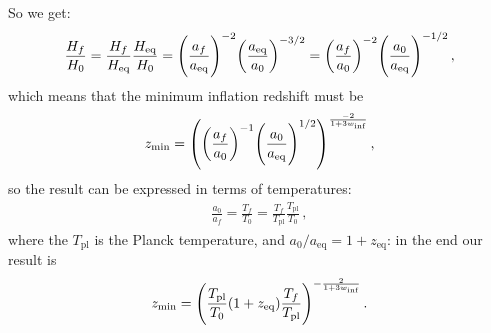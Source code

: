 \documentclass[main.tex]{subfiles}
\begin{document}
So we get: 
%
\begin{align}
  \frac{H_f}{H_0} 
  = \frac{H_f}{H _{\text{eq}}} \frac{H _{\text{eq}}}{H_0 } 
  = \qty(\frac{a_f}{a _{\text{eq}}})^{-2} \qty(\frac{a _{\text{eq}}}{a_0 })^{-3/2} 
  = \qty(\frac{a_f}{a_0 })^{-2} \qty(\frac{a_0}{a _{\text{eq}}})^{-1/2}
\,,
\end{align}
%
which means that the minimum inflation redshift must be 
%
\begin{align}
  z _{\text{min}} = \qty(\qty(\frac{a_f}{a_0 })^{-1} \qty(\frac{a_0 }{a _{\text{eq}}})^{1/2} )^{\frac{-2}{1 + 3 w _{\text{inf}}}}
\,,
\end{align}
%
so the result can be expressed in terms of temperatures: 
%
\begin{align}
  \frac{a_0}{a_f} = \frac{T_f}{T_0 } = \frac{T_f}{T _{\text{pl}}} \frac{T _{\text{pl}}}{T_0 }  
\,,
\end{align}
%
where the \(T _{\text{pl}}\) is the Planck temperature,
and \(a_0 / a _{\text{eq}} = 1 + z _{\text{eq}}\): in the end our result is 
%
\begin{align}
  z _{\text{min}} = \qty(\frac{T _{\text{pl}}}{T_0 } (1+ z _{\text{eq}}) \frac{T_f}{T _{\text{pl}}})^{- \frac{2}{1 + 3 w _{\text{inf}}}}
\,.
\end{align}
%
\end{document}
